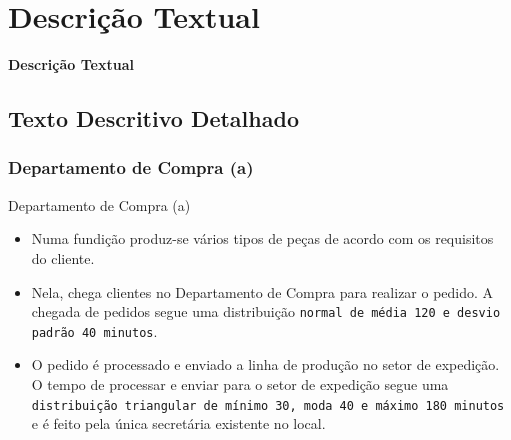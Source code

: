 \documentclass[xcolor=dvipsnames]{beamer}
\let\olditem=\item%
\renewcommand{\item}{\olditem \justifying}%
\begin{document}
\section{Descrição Textual}
\begin{frame}{}
	\centering
	\Huge \color{blue} \textbf{Descrição Textual}
\end{frame}
\subsection{Texto Descritivo Detalhado}
	
\subsubsection{Departamento de Compra (a)}
\begin{frame}{Departamento de Compra (a)}
	\begin{itemize}
		\item Numa fundição produz-se vários tipos de peças de acordo com os requisitos do cliente.
		      				
		      \bigskip
		      				
		\item Nela, chega clientes no Departamento de Compra para realizar o pedido. A chegada de pedidos segue uma distribuição \texttt{normal de média 120 e desvio padrão 40 minutos}.
		      				
		      \bigskip
		      				
		\item O pedido é processado e enviado a linha de produção no setor de expedição. O tempo de processar e enviar para o setor de expedição segue uma \texttt{distribuição triangular de mínimo 30, moda 40 e máximo 180 minutos} e é feito pela única secretária existente no local.
	\end{itemize}
\end{frame}
	
\end{document}
